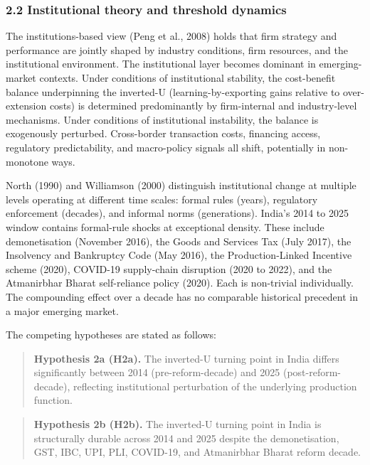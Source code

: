 \documentclass[
  12pt,a4paper]{article}
\begin{document}
\hypertarget{institutional-theory-and-threshold-dynamics}{%
\subsubsection{2.2 Institutional theory and threshold
dynamics}\label{institutional-theory-and-threshold-dynamics}}

The institutions-based view (Peng et al., 2008) holds that firm strategy
and performance are jointly shaped by industry conditions, firm
resources, and the institutional environment. The institutional layer
becomes dominant in emerging-market contexts. Under conditions of
institutional stability, the cost-benefit balance underpinning the
inverted-U (learning-by-exporting gains relative to over-extension
costs) is determined predominantly by firm-internal and industry-level
mechanisms. Under conditions of institutional instability, the balance
is exogenously perturbed. Cross-border transaction costs, financing
access, regulatory predictability, and macro-policy signals all shift,
potentially in non-monotone ways.

North (1990) and Williamson (2000) distinguish institutional change at
multiple levels operating at different time scales: formal rules
(years), regulatory enforcement (decades), and informal norms
(generations). India's 2014 to 2025 window contains formal-rule shocks
at exceptional density. These include demonetisation (November 2016),
the Goods and Services Tax (July 2017), the Insolvency and Bankruptcy
Code (May 2016), the Production-Linked Incentive scheme (2020), COVID-19
supply-chain disruption (2020 to 2022), and the Atmanirbhar Bharat
self-reliance policy (2020). Each is non-trivial individually. The
compounding effect over a decade has no comparable historical precedent
in a major emerging market.

The competing hypotheses are stated as follows:

\begin{quote}
\textbf{Hypothesis 2a (H2a).} The inverted-U turning point in India
differs significantly between 2014 (pre-reform-decade) and 2025
(post-reform-decade), reflecting institutional perturbation of the
underlying production function.
\end{quote}

\begin{quote}
\textbf{Hypothesis 2b (H2b).} The inverted-U turning point in India is
structurally durable across 2014 and 2025 despite the demonetisation,
GST, IBC, UPI, PLI, COVID-19, and Atmanirbhar Bharat reform decade.
\end{quote}
\end{document}
